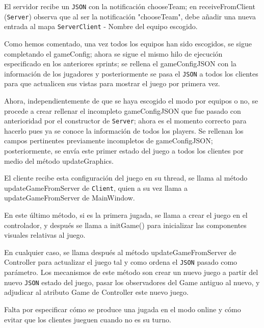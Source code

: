 \documentclass[12pt,a4paper,openright]{book}
\theoremstyle{break}
\begin{document}
El servidor recibe un \texttt{JSON} con la notificación chooseTeam; en receiveFromClient (\texttt{Server}) observa que al ser la notificación "chooseTeam", debe añadir una nueva entrada al mapa \texttt{ServerClient} - Nombre del equipo escogido.

Como hemos comentado, una vez todos los equipos han sido escogidos, se sigue completando el gameConfig; ahora se sigue el mismo hilo de ejecución especificado en los anteriores sprints; se rellena el gameConfigJSON con la información de los jugadores y posteriormente se pasa el \texttt{JSON} a todos los clientes para que actualicen sus vistas para mostrar el juego por primera vez.



Ahora, independientemente de que se haya escogido el modo por equipos o no, se procede a crear rellenar el incompleto gameConfigJSON que fue pasado con anterioridad por el constructor de \texttt{Server}; ahora es el momento correcto para hacerlo pues ya se conoce la información de todos los players. Se rellenan los campos pertinentes previamente incompletos de gameConfigJSON; posteriormente, se envía este primer estado del juego a todos los clientes por medio del método updateGraphics. 

El cliente recibe esta configuración del juego en su thread, se llama al método updateGameFromServer de \texttt{Client}, quien a su vez llama a updateGameFromServer de MainWindow.

En este último método, si es la primera jugada, se llama a crear el juego en el controlador, y después se llama a initGame() para inicializar las componentes visuales relativas al juego.

En cualquier caso, se llama después al método updateGameFromServer de Controller para actualizar el juego tal y como ordena el \texttt{JSON} pasado como parámetro. Los mecanismos de este método son crear un nuevo juego a partir del nuevo \texttt{JSON} estado del juego, pasar los observadores del Game antiguo al nuevo, y adjudicar al atributo Game de Controller este nuevo juego.

Falta por especificar cómo se produce una jugada en el modo online y cómo evitar que los clientes jueguen cuando no es su turno.
\end{document}
